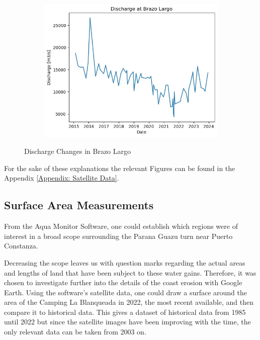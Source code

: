 \begin{figure}[H]
    \centering
    \begin{subfigure}{0.48\textwidth}
        \includegraphics[width=\linewidth]{figures/ch5/dischargepeak.jpg}
    \end{subfigure}
    
    \caption{Discharge Changes in Brazo Largo}
    \label{fig:Discharge Changes in Brazo Largo}
\end{figure}


For the sake of these explanations the relevant Figures can be found in the Appendix \ref{Appendix: Satellite Data}.

\subsection{Surface Area Measurements}
From the Aqua Monitor Software, one could establish which regions were of interest in a broad scope surrounding the Parana Guazu turn near Puerto Constanza. 

Decreasing the scope leaves us with question marks regarding the actual areas and lengths of land that have been subject to these water gains. Therefore, it was chosen to investigate further into the details of the coast erosion with Google Earth.
Using the software's satellite data, one could draw a surface around the area of the Camping La Blanqueada in 2022, the most recent available, and then compare it to historical data. 
This gives a dataset of historical data from 1985 until 2022 but since the satellite images have been improving with the time, the only relevant data can be taken from 2003 on.


